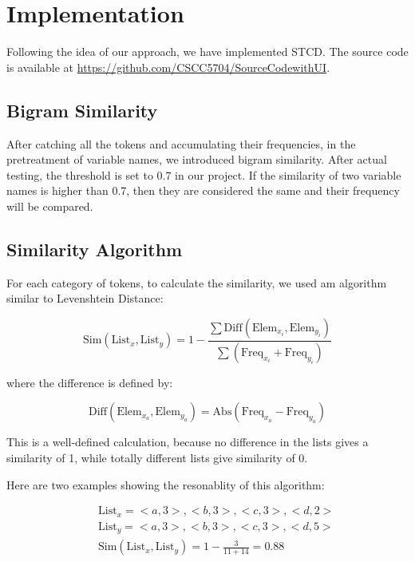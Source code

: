 \documentclass[../main.tex]{subfiles}
\begin{document}
\section{Implementation}

Following the idea of our approach, we have implemented STCD. The source code is available at {\color{blue} \url{https://github.com/CSCC5704/SourceCodewithUI}}.

\subsection{Bigram Similarity}

After catching all the tokens and accumulating their frequencies, in the pretreatment of variable names, we introduced bigram similarity. After actual testing, the threshold is set to 0.7 in our project. If the similarity of two variable names is higher than 0.7, then they are considered the same and their frequency will be compared.

\subsection{Similarity Algorithm}

For each category of tokens, to calculate the similarity, we used am algorithm similar to Levenshtein Distance:

\begin{equation}
\text{Sim}(\text{List}_x, \text{List}_y) = 1 - \frac{\sum \text{Diff}(\text{Elem}_{x_i}, \text{Elem}_{y_i})} {\sum (\text{Freq}_{x_i} + \text{Freq}_{y_i} )}
\end{equation}

where the difference is defined by:

\begin{equation}
\text{Diff}(\text{Elem}_{x_a}, \text{Elem}_{y_a}) = \text{Abs}(\text{Freq}_{x_a} - \text{Freq}_{y_a})
\end{equation}

This is a well-defined calculation, because no difference in the lists gives a similarity of 1, while totally different lists give similarity of 0.

Here are two examples showing the resonablity of this algorithm:

\begin{eqnarray}\nonumber
&&\text{List}_x = {<a, 3>, <b, 3>, <c, 3>, <d, 2>}\\ \nonumber
&&\text{List}_y = {<a, 3>, <b, 3>, <c, 3>, <d, 5>} \\ 
&&\text{Sim}(\text{List}_x, \text{List}_y) = 1 - \frac{3}{11 + 14} = 0.88
\end{eqnarray}
\end{document}
